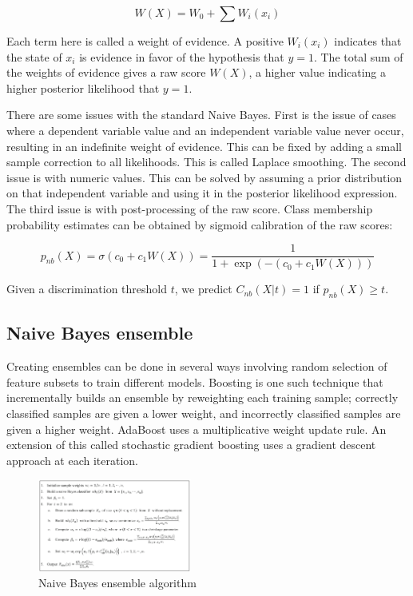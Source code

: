 \documentclass[sigconf]{acmart}
\begin{document}
\begin{equation}
W(X) = W_0 + \sum W_i(x_i)
\label{eq:3}
\end{equation}

Each term here is called a weight of evidence. A positive $W_i(x_i)$ indicates that the state of $x_i$ is evidence in favor of the hypothesis that $y=1$. The total sum of the weights of evidence gives a raw score $W(X)$, a higher value indicating a higher posterior likelihood that $y=1$.

There are some issues with the standard Naive Bayes. First is the issue of cases where a dependent variable value and an independent variable value never occur, resulting in an indefinite weight of evidence. This can be fixed by adding a small sample correction to all likelihoods. This is called Laplace smoothing. The second issue is with numeric values. This can be solved by assuming a prior distribution on that independent variable and using it in the posterior likelihood expression. The third issue is with post-processing of the raw score. Class membership probability estimates can be obtained by sigmoid calibration of the raw scores:

\begin{equation}
p_{nb}(X) = \sigma(c_0 + c_1 W(X)) = \frac{1}{1 + \exp(-(c_0 + c_1 W(X)))}
\label{eq:4}
\end{equation}

Given a discrimination threshold $t$, we predict $C_{nb}(X|t) = 1$ if $p_{nb}(X) \geq t$.

\subsection{Naive Bayes ensemble}
Creating ensembles can be done in several ways involving random selection of feature subsets to train different models. Boosting is one such technique that incrementally builds an ensemble by reweighting each training sample; correctly classified samples are given a lower weight, and incorrectly classified samples are given a higher weight. AdaBoost \cite{freund1997decision} uses a multiplicative weight update rule. An extension of this called stochastic gradient boosting uses a gradient descent approach at each iteration.

\begin{figure}
\includegraphics[width=0.45\textwidth]{fig1.png}
\caption{Naive Bayes ensemble algorithm}
\label{fig:1}
\end{figure}
\end{document}
